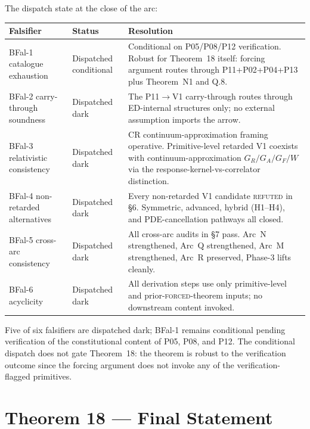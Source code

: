 \documentclass[11pt,a4paper]{article}
\begin{document}
The dispatch state at the close of the arc:

\begin{longtable}{p{} p{} p{}}
\toprule
\textbf{Falsifier} & \textbf{Status} & \textbf{Resolution} \\
\midrule
\endhead
BFal-1 catalogue exhaustion & Dispatched conditional & Conditional on P05/P08/P12 verification. Robust for Theorem~18 itself: forcing argument routes through P11+P02+P04+P13 plus Theorem~N1 and Q.8. \\
BFal-2 carry-through soundness & Dispatched dark & The P11$\to$V1 carry-through routes through ED-internal structures only; no external assumption imports the arrow. \\
BFal-3 relativistic consistency & Dispatched dark & CR continuum-approximation framing operative. Primitive-level retarded V1 coexists with continuum-approximation $G_R/G_A/G_F/W$ via the response-kernel-vs-correlator distinction. \\
BFal-4 non-retarded alternatives & Dispatched dark & Every non-retarded V1 candidate \textsc{refuted} in \S6. Symmetric, advanced, hybrid (H1--H4), and PDE-cancellation pathways all closed. \\
BFal-5 cross-arc consistency & Dispatched dark & All cross-arc audits in \S7 pass. Arc~N strengthened, Arc~Q strengthened, Arc~M strengthened, Arc~R preserved, Phase-3 lifts cleanly. \\
BFal-6 acyclicity & Dispatched dark & All derivation steps use only primitive-level and prior-\textsc{forced}-theorem inputs; no downstream content invoked. \\
\bottomrule
\end{longtable}

Five of six falsifiers are dispatched dark; BFal-1 remains conditional pending verification of the constitutional content of P05, P08, and P12. The conditional dispatch does not gate Theorem~18: the theorem is robust to the verification outcome since the forcing argument does not invoke any of the verification-flagged primitives.

\section{Theorem 18 --- Final Statement}
\end{document}
